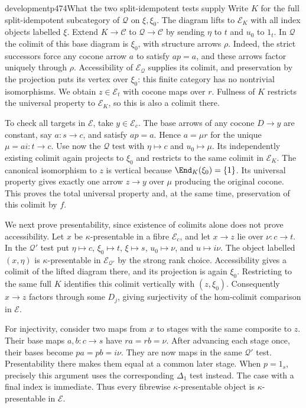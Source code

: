 \begin{dcomment}{development}{p474}{What the two split-idempotent tests supply}
Write $K$ for the full split-idempotent subcategory of $\mathcal Q$ on $\xi,\xi_0$. The diagram lifts to $\mathcal E_K$ with all index objects labelled $\xi$. Extend $K\to\mathcal C$ to $\mathcal Q\to\mathcal C$ by sending $\eta$ to $t$ and $u_0$ to $1_t$. In $\mathcal Q$ the colimit of this base diagram is $\xi_0$, with structure arrows $\rho$. Indeed, the strict successors force any cocone arrow $a$ to satisfy $ap=a$, and these arrows factor uniquely through $\rho$. Accessibility of $\mathcal E_{\mathcal Q}$ supplies its colimit, and preservation by the projection puts its vertex over $\xi_0$: this finite category has no nontrivial isomorphisms. We obtain $z\in\mathcal E_t$ with cocone maps over $r$. Fullness of $K$ restricts the universal property to $\mathcal E_K$, so this is also a colimit there.

To check all targets in $\mathcal E$, take $y\in\mathcal E_c$. The base arrows of any cocone $D\to y$ are constant, say $a:s\to c$, and satisfy $ap=a$. Hence $a=\mu r$ for the unique $\mu=ai:t\to c$. Use now the $\mathcal Q$ test with $\eta\mapsto c$ and $u_0\mapsto\mu$. Its independently existing colimit again projects to $\xi_0$ and restricts to the same colimit in $\mathcal E_K$. The canonical isomorphism to $z$ is vertical because $\End_K(\xi_0)=\{1\}$. Its universal property gives exactly one arrow $z\to y$ over $\mu$ producing the original cocone. This proves the total universal property and, at the same time, preservation of this colimit by $f$.

We next prove presentability, since existence of colimits alone does not prove accessibility. Let $x$ be $\kappa$-presentable in a fibre $\mathcal E_c$, and let $x\to z$ lie over $\nu:c\to t$. In the $\mathcal Q'$ test put $\eta\mapsto c$, $\xi_0\mapsto t$, $\xi\mapsto s$, $u_0\mapsto\nu$, and $u\mapsto i\nu$. The object labelled $(x,\eta)$ is $\kappa$-presentable in $\mathcal E_{\mathcal Q'}$ by the strong rank choice. Accessibility gives a colimit of the lifted diagram there, and its projection is again $\xi_0$. Restricting to the same full $K$ identifies this colimit vertically with $(z,\xi_0)$. Consequently $x\to z$ factors through some $D_j$, giving surjectivity of the hom-colimit comparison in $\mathcal E$.

For injectivity, consider two maps from $x$ to stages with the same composite to $z$. Their base maps $a,b:c\to s$ have $ra=rb=\nu$. After advancing each stage once, their bases become $pa=pb=i\nu$. They are now maps in the same $\mathcal Q'$ test. Presentability there makes them equal at a common later stage. When $p=1_s$, precisely this argument uses the corresponding $\Delta_1$ test instead. The case with a final index is immediate. Thus every fibrewise $\kappa$-presentable object is $\kappa$-presentable in $\mathcal E$.


\end{dcomment}

